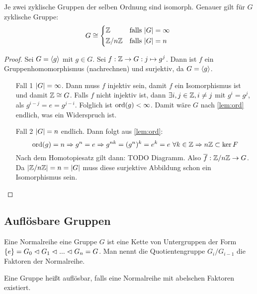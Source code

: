 \documentclass[12pt,a4paper]{scrartcl}
\begin{document}
\begin{satz}
	Je zwei zyklische Gruppen der selben Ordnung sind isomorph. Genauer gilt für $G$ zyklische Gruppe: 
	\begin{equation*}
		G \cong \begin{cases*}
			\IZ &falls $\abs G = \infty$ \\
			\IZ/n\IZ &falls $\abs G = n$
		\end{cases*}
	\end{equation*}
\end{satz}

\begin{proof}
	Sei $G = \langle g\rangle$ mit $g \in G$. Sei $f: \mathbb Z \rightarrow G : j \mapsto g^j$. Dann ist $f$ ein Gruppenhomomorphismus (nachrechnen) und surjektiv, da $G = \langle g\rangle$.
	\begin{itemize}
		\item[Fall 1] $\lvert G\rvert = \infty$. Dann muss $f$ injektiv sein, damit $f$ ein Isomorphismus ist und damit $\mathbb Z \cong G$. Falls $f$ nicht injektiv ist, dann $\exists i,j \in \mathbb Z, i\neq j$ mit $g^i=g^j$, als $g^{i-j} = e = g^{j-i}$. Folglich ist $\operatorname{ord}(g) < \infty$. Damit wäre $G$ nach \ref{lem:ord} endlich, was ein Widerspruch ist.
		\item[Fall 2] $\lvert G\rvert = n$ endlich. Dann folgt aus \ref{lem:ord}: 
		\begin{equation*}
			\operatorname{ord}(g)=n \Rightarrow g^n = e \Rightarrow g^{nk} = (g^n)^k = e^k = e ~ \forall k\in \mathbb Z \Rightarrow n\mathbb Z \subset \operatorname{ker} F
		\end{equation*}
		Nach dem Homotopiesatz gilt dann: TODO Diagramm. Also $\overline{f} : \mathbb Z/n\mathbb Z \rightarrow G$. Da $\lvert\mathbb Z/n\mathbb Z\rvert = n = \lvert G\rvert$ muss diese surjektive Abbildung schon ein Isomorphismus sein.
	\end{itemize}
\end{proof}

\subsection{Auflösbare Gruppen}
\begin{defi}
	Eine Normalreihe eine Gruppe $G$ ist eine Kette von Untergruppen der Form $\left\lbrace e\right\rbrace = G_0 \vartriangleleft G_1 \vartriangleleft ... \vartriangleleft G_n = G$. Man nennt die Quotientengruppe $G_i/G_{i-1}$ die Faktoren der Normalreihe.
\end{defi}

\begin{defi}
	Eine Gruppe heißt auflösbar, falls eine Normalreihe mit abelschen Faktoren existiert.
\end{defi}
\end{document}

